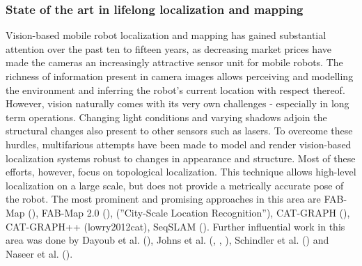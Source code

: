 \endgroup




\subsubsection{State of the art in lifelong localization and mapping}
Vision-based mobile robot localization and mapping has gained substantial attention over the past ten to fifteen years, as decreasing market prices have made the  cameras an increasingly attractive sensor unit for mobile robots. The richness of information present in camera images allows perceiving and modelling the environment and inferring the robot's current location with respect thereof. However, vision naturally comes with its very own challenges - especially in long term operations. Changing light conditions and varying shadows adjoin the structural changes also present to other sensors such as lasers. To overcome these hurdles, multifarious attempts have been made to model and render vision-based localization systems robust to changes in appearance and structure. Most of these efforts, however, focus on topological localization. This technique allows high-level localization on a large scale, but does not provide a metrically accurate pose of the robot. The most prominent and promising approaches in this area are FAB-Map (\cite{cummins2008fab}), FAB-Map 2.0 (\cite{cummins2011appearance}), (''City-Scale Location Recognition''), CAT-GRAPH (\cite{maddern2013towards}), CAT-GRAPH++ (lowry2012cat), SeqSLAM (\cite{milford2012seqslam}). Further influential work in this area was done by Dayoub et al. (\cite{dayoub2008adaptive}), Johns et al. (\cite{johns2013feature}, \cite{johns2013dynamic}, \cite{johns2014generative}),  Schindler et al. (\cite{schindler2007city}) and Naseer et al. (\cite{naseer2014robust}).

